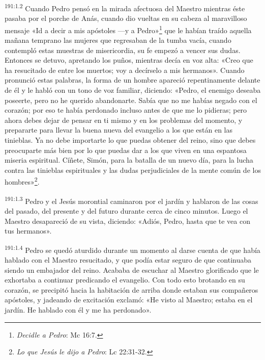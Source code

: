 \par 
\textsuperscript{191:1.2} Cuando Pedro pensó en la mirada afectuosa del Maestro mientras éste pasaba por el porche de Anás, cuando dio vueltas en su cabeza al maravilloso mensaje «Id a decir a mis apóstoles ---y a Pedro»\footnote{\textit{Decidle a Pedro}: Mc 16:7.} que le habían traído aquella mañana temprano las mujeres que regresaban de la tumba vacía, cuando contempló estas muestras de misericordia, su fe empezó a vencer sus dudas. Entonces se detuvo, apretando los puños, mientras decía en voz alta: «Creo que ha resucitado de entre los muertos; voy a decírselo a mis hermanos». Cuando pronunció estas palabras, la forma de un hombre apareció repentinamente delante de él y le habló con un tono de voz familiar, diciendo: «Pedro, el enemigo deseaba poseerte, pero no he querido abandonarte. Sabía que no me habías negado con el corazón; por eso te había perdonado incluso antes de que me lo pidieras; pero ahora debes dejar de pensar en ti mismo y en los problemas del momento, y prepararte para llevar la buena nueva del evangelio a los que están en las tinieblas. Ya no debe importarte lo que puedas obtener del reino, sino que debes preocuparte más bien por lo que puedas dar a los que viven en una espantosa miseria espiritual. Cíñete, Simón, para la batalla de un nuevo día, para la lucha contra las tinieblas espirituales y las dudas perjudiciales de la mente común de los hombres»\footnote{\textit{Lo que Jesús le dijo a Pedro}: Lc 22:31-32.}.

\par 
\textsuperscript{191:1.3} Pedro y el Jesús morontial caminaron por el jardín y hablaron de las cosas del pasado, del presente y del futuro durante cerca de cinco minutos. Luego el Maestro desapareció de su vista, diciendo: «Adiós, Pedro, hasta que te vea con tus hermanos».

\par 
\textsuperscript{191:1.4} Pedro se quedó aturdido durante un momento al darse cuenta de que había hablado con el Maestro resucitado, y que podía estar seguro de que continuaba siendo un embajador del reino. Acababa de escuchar al Maestro glorificado que le exhortaba a continuar predicando el evangelio. Con todo esto brotando en su corazón, se precipitó hacia la habitación de arriba donde estaban sus compañeros apóstoles, y jadeando de excitación exclamó: «He visto al Maestro; estaba en el jardín. He hablado con él y me ha perdonado».

